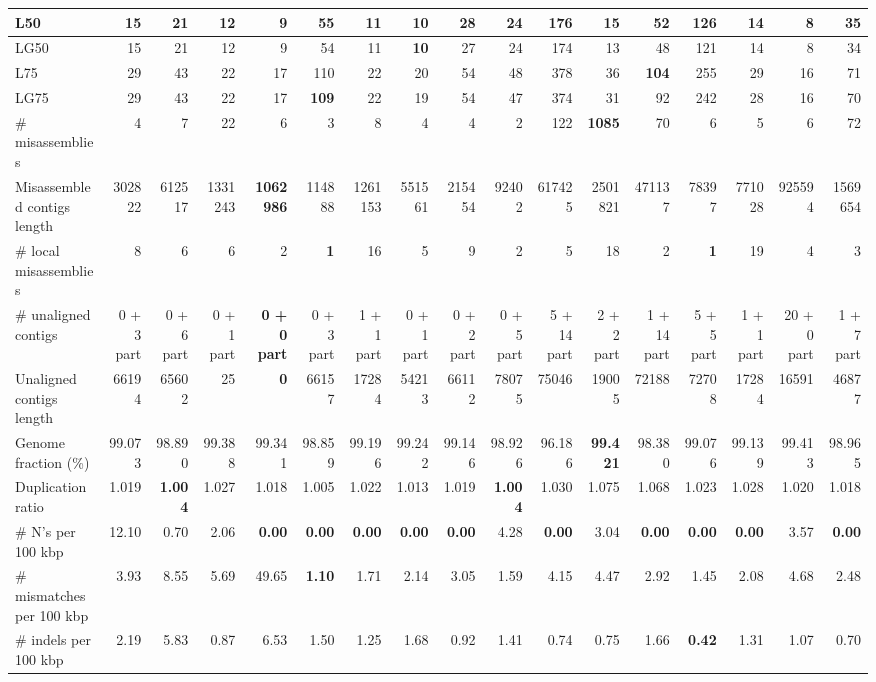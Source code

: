 \documentclass[12pt,a4paper]{article}
\begin{document}
\begin{table}[ht]
\begin{center}
\begin{tabular}{|l*{16}{|r}|}
L50 & 15 & 21 & 12 & 9 & 55 & 11 & {\bf 10} & 28 & 24 & 176 & 15 & 52 & 126 & 14 & 8 & 35 \\ \hline
LG50 & 15 & 21 & 12 & 9 & 54 & 11 & {\bf 10} & 27 & 24 & 174 & 13 & 48 & 121 & 14 & 8 & 34 \\ \hline
L75 & 29 & 43 & 22 & 17 & 110 & 22 & 20 & 54 & 48 & 378 & 36 & {\bf 104} & 255 & 29 & 16 & 71 \\ \hline
LG75 & 29 & 43 & 22 & 17 & {\bf 109} & 22 & 19 & 54 & 47 & 374 & 31 & 92 & 242 & 28 & 16 & 70 \\ \hline
\# misassemblies & 4 & 7 & 22 & 6 & 3 & 8 & 4 & 4 & 2 & 122 & {\bf 1085} & 70 & 6 & 5 & 6 & 72 \\ \hline
Misassembled contigs length & 302822 & 612517 & 1331243 & {\bf 1062986} & 114888 & 1261153 & 551561 & 215454 & 92402 & 617425 & 2501821 & 471137 & 78397 & 771028 & 925594 & 1569654 \\ \hline
\# local misassemblies & 8 & 6 & 6 & 2 & {\bf 1} & 16 & 5 & 9 & 2 & 5 & 18 & 2 & {\bf 1} & 19 & 4 & 3 \\ \hline
\# unaligned contigs & 0 + 3 part & 0 + 6 part & 0 + 1 part & {\bf 0 + 0 part} & 0 + 3 part & 1 + 1 part & 0 + 1 part & 0 + 2 part & 0 + 5 part & 5 + 14 part & 2 + 2 part & 1 + 14 part & 5 + 5 part & 1 + 1 part & 20 + 0 part & 1 + 7 part \\ \hline
Unaligned contigs length & 66194 & 65602 & 25 & {\bf 0} & 66157 & 17284 & 54213 & 66112 & 78075 & 75046 & 19005 & 72188 & 72708 & 17284 & 16591 & 46877 \\ \hline
Genome fraction (\%) & 99.073 & 98.890 & 99.388 & 99.341 & 98.859 & 99.196 & 99.242 & 99.146 & 98.926 & 96.186 & {\bf 99.421} & 98.380 & 99.076 & 99.139 & 99.413 & 98.965 \\ \hline
Duplication ratio & 1.019 & {\bf 1.004} & 1.027 & 1.018 & 1.005 & 1.022 & 1.013 & 1.019 & {\bf 1.004} & 1.030 & 1.075 & 1.068 & 1.023 & 1.028 & 1.020 & 1.018 \\ \hline
\# N's per 100 kbp & 12.10 & 0.70 & 2.06 & {\bf 0.00} & {\bf 0.00} & {\bf 0.00} & {\bf 0.00} & {\bf 0.00} & 4.28 & {\bf 0.00} & 3.04 & {\bf 0.00} & {\bf 0.00} & {\bf 0.00} & 3.57 & {\bf 0.00} \\ \hline
\# mismatches per 100 kbp & 3.93 & 8.55 & 5.69 & 49.65 & {\bf 1.10} & 1.71 & 2.14 & 3.05 & 1.59 & 4.15 & 4.47 & 2.92 & 1.45 & 2.08 & 4.68 & 2.48 \\ \hline
\# indels per 100 kbp & 2.19 & 5.83 & 0.87 & 6.53 & 1.50 & 1.25 & 1.68 & 0.92 & 1.41 & 0.74 & 0.75 & 1.66 & {\bf 0.42} & 1.31 & 1.07 & 0.70 \\ \hline

\end{tabular}
\end{center}
\end{table}
\end{document}
